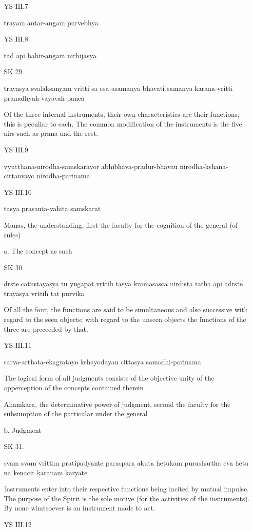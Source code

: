 YS III.7

trayam antar-angam purvebhya

YS III.8

tad api bahir-angam nirbijasya

SK 29.

trayasya svalaksanyam vritti sa esa asamanya bhavati
samanya karana-vritti pranadhyah-vayavah-panca

Of the three internal instruments,
their own characteristics are their functions;
this is peculiar to each.
The common modification of the instruments is the five airs
such as prana and the rest.

YS III.9

vyutthana-nirodha-samskarayor abhibhava-pradur-bhavau
nirodha-kshana-cittanvayo nirodha-parinama

YS III.10

tasya prasanta-vahita samskarat

Manas, the understanding, first the faculty for
the cognition of the general (of rules)

a. The concept as such

SK 30.

drste catustayasya tu yugapat vrttih tasya kramasasca nirdista
tatha api adrste trayasya vrttih tat purvika

Of all the four, the functions are said to be simultaneous and also successive
with regard to the seen objects;
with regard to the unseen objects
the functions of the three are preceeded by that.

YS III.11

sarva-arthata-ekagratayo kshayodayau cittasya samadhi-parinama

The logical form of all judgments consists of
the objective unity of the apperception of the concepts contained therein

Ahamkara, the determinative power of judgment,
second the faculty for the subsumption of the particular under the general

b. Judgment

SK 31.

svam svam vrittim pratipadyante paraspara akuta hetukam
purushartha eva hetu na kenacit karanam karyate

Instruments enter into their respective functions
being incited by mutual impulse.
The purpose of the Spirit is the sole motive
(for the activities of the instruments).
By none whatsoever is an instrument made to act.

YS III.12

